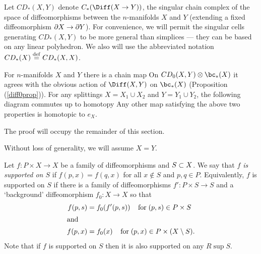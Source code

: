
Let $CD_*(X, Y)$ denote $C_*(\Diff(X \to Y))$, the singular chain complex of
the space of diffeomorphisms
between the $n$-manifolds $X$ and $Y$ (extending a fixed diffeomorphism $\partial X \to \partial Y$).
For convenience, we will permit the singular cells generating $CD_*(X, Y)$ to be more general
than simplices --- they can be based on any linear polyhedron.
We also will use the abbreviated notation $CD_*(X) \stackrel{\mathrm{def}}{=} CD_*(X, X)$.

\begin{prop}  \label{CDprop}
For $n$-manifolds $X$ and $Y$ there is a chain map
On $CD_0(X, Y) \otimes \bc_*(X)$ it agrees with the obvious action of $\Diff(X, Y)$ on $\bc_*(X)$
(Proposition (\ref{diff0prop})).
For any splittings $X = X_1 \cup X_2$ and $Y = Y_1 \cup Y_2$, 
the following diagram commutes up to homotopy
Any other map satisfying the above two properties is homotopic to $e_X$.
\end{prop}



\medskip

The proof will occupy the remainder of this section.

Without loss of generality, we will assume $X = Y$.

\medskip

Let $f: P \times X \to X$ be a family of diffeomorphisms and $S \subset X$.
We say that {\it $f$ is supported on $S$} if $f(p, x) = f(q, x)$ for all
$x \notin S$ and $p, q \in P$. Equivalently, $f$ is supported on $S$ if there is a family of diffeomorphisms $f' : P \times S \to S$ and a `background'
diffeomorphism $f_0 : X \to X$ so that
\begin{align}
	f(p,s) & = f_0(f'(p,s)) \;\;\;\; \mbox{for}\; (p, s) \in P\times S \\
\intertext{and}
	f(p,x) & = f_0(x) \;\;\;\; \mbox{for}\; (p, x) \in {P \times (X \setminus S)}.
\end{align}
Note that if $f$ is supported on $S$ then it is also supported on any $R \sup S$.

